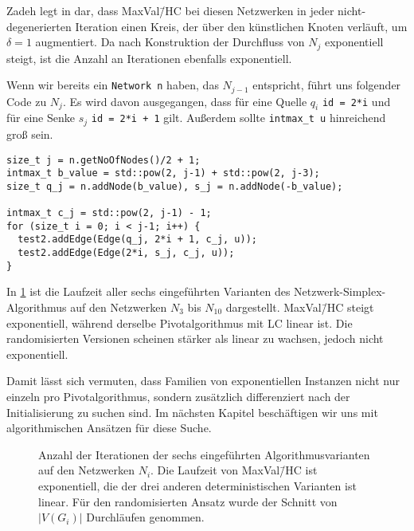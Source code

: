 Zadeh legt in \cite[S. 263\,f.]{Exponential} dar, dass MaxVal\=/HC bei diesen Netzwerken in jeder nicht-degenerierten Iteration einen Kreis, der über den künstlichen Knoten verläuft, um $\delta=1$ augmentiert. Da nach Konstruktion der Durchfluss von $N_j$ exponentiell steigt, ist die Anzahl an Iterationen ebenfalls exponentiell.

Wenn wir bereits ein \lstinline|Network n| haben, das $N_{j-1}$ entspricht, führt uns folgender Code zu $N_{j}$. Es wird davon ausgegangen, dass für eine Quelle $q_i$ \lstinline|id = 2*i| und für eine Senke $s_j$ \lstinline|id = 2*i + 1| gilt. Außerdem sollte \lstinline|intmax_t u| hinreichend groß sein.

\begin{lstlisting}
size_t j = n.getNoOfNodes()/2 + 1;
intmax_t b_value = std::pow(2, j-1) + std::pow(2, j-3);
size_t q_j = n.addNode(b_value), s_j = n.addNode(-b_value);

intmax_t c_j = std::pow(2, j-1) - 1;
for (size_t i = 0; i < j-1; i++) {
  test2.addEdge(Edge(q_j, 2*i + 1, c_j, u));
  test2.addEdge(Edge(2*i, s_j, c_j, u));
}
\end{lstlisting}

In \cref{fig:plot_exp} ist die Laufzeit aller sechs eingeführten Varianten des Netzwerk-Simplex-Algorithmus auf den Netzwerken $N_3$ bis $N_{10}$ dargestellt. MaxVal\=/HC steigt exponentiell, während derselbe Pivotalgorithmus mit LC linear ist. Die randomisierten Versionen scheinen stärker als linear zu wachsen, jedoch nicht exponentiell.

Damit lässt sich vermuten, dass Familien von exponentiellen Instanzen nicht nur einzeln pro Pivotalgorithmus, sondern zusätzlich differenziert nach der Initialisierung zu suchen sind. Im nächsten Kapitel beschäftigen wir uns mit algorithmischen Ansätzen für diese Suche. 

\begin{figure}[!ht]\centering
    
    \caption{Anzahl der Iterationen der sechs eingeführten Algorithmusvarianten auf den Netzwerken $N_i$. Die Laufzeit von MaxVal\=/HC ist exponentiell, die der drei anderen deterministischen Varianten ist linear. Für den randomisierten Ansatz wurde der Schnitt von $|V(G_i)|$ Durchläufen genommen.}
    \label{fig:plot_exp}
\end{figure}
